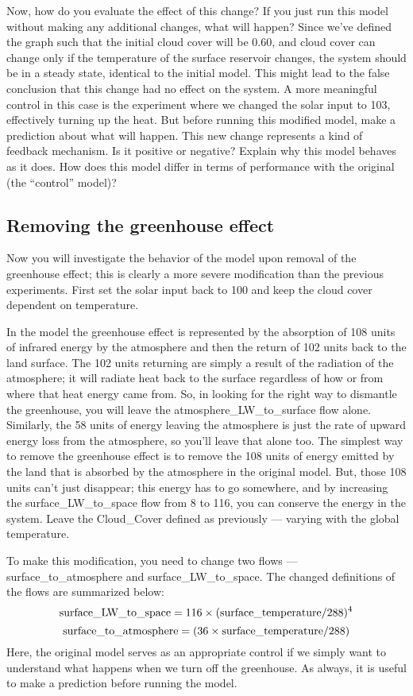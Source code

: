 \documentclass[11pt,letterpaper]{article}
\begin{document}
Now, how do you evaluate the effect of this change? If you just run this model without making any additional changes,
what will happen? Since we've defined the graph such that the initial cloud cover will be 0.60, and cloud cover can change only if the
temperature of the surface reservoir changes, the system should be in a steady state, identical to the initial model. This might lead to the
false conclusion that this change had no effect on the system. A more meaningful control in this case is the experiment where we changed the solar input to 103, effectively turning up the heat. But before running this modified model, make a prediction about what will happen.
This new change represents a kind of feedback mechanism. Is it positive or negative? Explain why this model behaves as it does.
How does this model differ in terms of performance with the original (the ``control'' model)?

\subsection{Removing the greenhouse effect}
Now you will investigate the behavior of the model upon removal of the greenhouse effect; this is clearly a more severe modification than the previous experiments. First set the solar input back to 100 and keep the cloud cover dependent on temperature.

In the model the greenhouse effect is represented by the absorption of 108 units of infrared energy by the atmosphere and then the return of 102 units back to the land surface. The 102 units returning are simply a result of the radiation of the atmosphere; it will radiate heat back to the surface regardless of how or from where that heat energy came from. So, in looking for the right way to
dismantle the greenhouse, you will leave the atmosphere\_LW\_to\_surface flow alone. Similarly, the 58 units of energy leaving the
atmosphere is just the rate of upward energy loss from the atmosphere, so you'll leave that alone too. The simplest way to remove the
greenhouse effect is to remove the 108 units of energy emitted by the land that is absorbed by the atmosphere in the original model.
But, those 108 units can't just disappear; this energy has to go somewhere, and by increasing the surface\_LW\_to\_space flow from 8
to 116, you can conserve the energy in the system. Leave the Cloud\_Cover defined as previously --- varying with the global
temperature.

To make this modification, you need to change two flows --- surface\_to\_atmosphere and surface\_LW\_to\_space. The changed
definitions of the flows are summarized below:
$$\rm surface\_LW\_to\_space = 116\times(surface\_temperature/288)^4$$
$$\rm surface\_to\_atmosphere = (36\times surface\_temperature/288)$$
Here, the original model serves as an appropriate control if we simply want to understand what happens when we turn off the
greenhouse. As always, it is useful to make a prediction before running the model.
\end{document}
